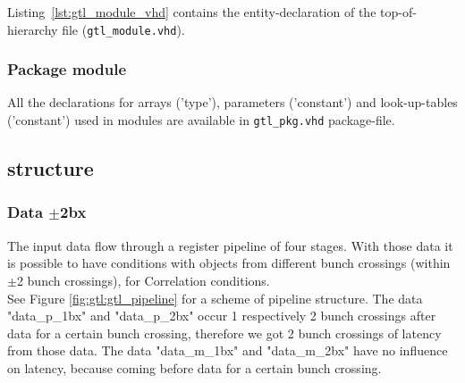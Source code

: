 Listing~\ref{lst:gtl_module_vhd} contains the entity-declaration of the top-of-hierarchy file (\texttt{gtl\_module.vhd}).



\subsubsection{Package module}
\label{sec:gtl:package_module}

All the declarations for arrays ('type'), parameters ('constant') and look-up-tables ('constant') used in modules are available in \texttt{gtl\_pkg.vhd} package-file.

\clearpage

\subsection{\ugtl structure}
\label{sec:gtl:mgtl_structure}

\subsubsection{Data $\pm$2bx}
\label{sec:gtl:data_p_m_2bx}

The \ugtl input data flow through a register pipeline of four stages. With those data it is possible to have conditions with objects from
different bunch crossings (within $\pm$2 bunch crossings), \eg for Correlation conditions.\\
See Figure \ref{fig:gtl:gtl_pipeline} for a scheme of \ugtl pipeline structure. The data "data\_p\_1bx" and "data\_p\_2bx" occur 1 respectively 2 bunch crossings
after data for a certain bunch crossing, therefore we got 2 bunch crossings of latency from those data. The data "data\_m\_1bx" and "data\_m\_2bx" have no influence
on latency, because coming before data for a certain bunch crossing.


